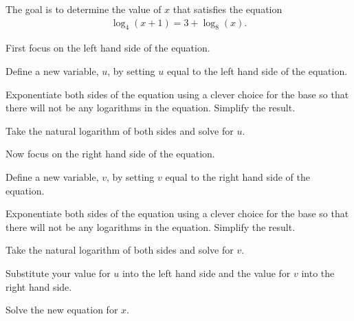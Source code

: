 \begin{problem}
\item The goal is to determine the value of $x$ that satisfies the
  equation
  \begin{eqnarray*}
    \log_4(x+1) = 3 + \log_8(x).
  \end{eqnarray*}
  \vspace{-2em}
  \begin{subproblem}
  \item First focus on the left hand side of the equation.
    \begin{subsubproblem}
    \item Define a new variable, $u$, by setting $u$ equal to the left
      hand side of the equation.
      \vspace{1em}
    \item Exponentiate both sides of the equation using a clever
      choice for the base so that there will not be any logarithms in
      the equation. Simplify the result.
      \vspace{2em}
    \item Take the natural logarithm of both sides and solve for $u$.
      \vspace{2em}
    \end{subsubproblem}
  \item Now focus on the right hand side of the equation.
    \begin{subsubproblem}
    \item Define a new variable, $v$, by setting $v$ equal to the right
      hand side of the equation.
      \vspace{1em}
    \item Exponentiate both sides of the equation using a clever
      choice for the base so that there will not be any logarithms in
      the equation. Simplify the result.
      \vspace{2em}
    \item Take the natural logarithm of both sides and solve for $v$.
      \vspace{2em}
    \end{subsubproblem}
  \item Substitute your value for $u$ into the left hand side and the
    value for $v$ into the right hand side.
    \vspace{1em}
  \item Solve the new equation for $x$.
    \vfill
  \end{subproblem}

\clearpage


\end{problem}
